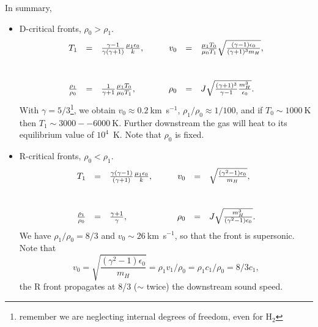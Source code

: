 \begin{frame}{}

In summary,
\begin{itemize}
\item D-critical fronts, $\rho_0 > \rho_1$.  \medskip
\begin{equation}\label{eq:D}
\begin{array}{rclcrcl}
T_1 &  =  &  \frac{\gamma-1 }{\gamma (\gamma + 1) } \frac{\mu_1
  \epsilon_0}{k},  &   ~~~  &  v_0  & = &  \frac{\mu_1 T_0}{\mu_0 T_1} \sqrt{
  \frac{ (\gamma - 1) \epsilon_0 }{ (\gamma  + 1)^3 m_H}
},  \vspace{1cm} \\ 
\frac{\rho_1}{\rho_0} &  = &  \frac{1}{\gamma + 1} \frac{\mu_1 T_0}{\mu_0
  T_1},  & ~~~  & \rho_0 &  = &  J \sqrt{  \frac{ (\gamma+1)^3}{\gamma
    - 1} \frac{m_H^3}{\epsilon_0}}. 
\end{array}
\end{equation}
With $\gamma = 5/3$\footnote{remember we are neglecting internal
  degrees of freedom, even for H$_2$}, we obtain $v_0 \approx
0.2~$km~s$^{-1}$, $\rho_1 / \rho_0 \approx 1/100$, and if $T_0 \sim
1000~$K then $T_1 \sim 3000--6000~$K. Further downstream the gas will
heat to its equilibrium value of $10^4$~K. Note that $\rho_0$ is
fixed.
\end{itemize}

\end{frame}





\begin{frame}{}

\begin{itemize}
\item R-critical fronts, $\rho_0 < \rho_1$.
\begin{equation} \label{eq:R}
\begin{array}{rclcrcl}
T_1 &  =  &  \frac{ \gamma( \gamma-1) }{ (\gamma + 1) } \frac{\mu_1
  \epsilon_0}{k},  &   ~~~  &  v_0  & = & \sqrt{
  \frac{ (\gamma^2 - 1) \epsilon_0 }{  m_H}
},  \vspace{1cm} \\ 
\frac{\rho_1}{\rho_0} &  = &  \frac{\gamma+1}{\gamma},  & ~~~  &
\rho_0 &  = &  J \sqrt{  \frac{ m_H^3}{ (\gamma^2 -1)\epsilon_0}}. 
\end{array}
\end{equation}
We have $\rho_1 / \rho_0 = 8/3$ and $v_0 \sim 26~$km~s$^{-1}$, so that
the front is supersonic. Note that 
\[
v_0 = \sqrt{\frac{ (\gamma^2 - 1) \epsilon_0 }{m_H}} = \rho_1 v_1  /
\rho_0 = \rho_1 c_1 / \rho_0 = 8/3 c_1, 
\]
the R front propagates at 8/3 ($\sim$ twice) the downstream sound speed.

\end{itemize}

\end{frame}






